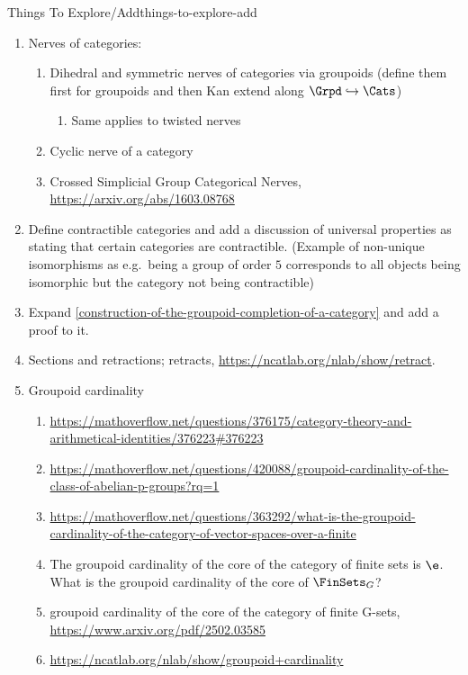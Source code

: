\begin{remark}{Things To Explore/Add}{things-to-explore-add}
\begin{enumerate}
        \item Nerves of categories:
            \begin{enumerate}
                \item Dihedral and symmetric nerves of categories via groupoids (define them first for groupoids and then Kan extend along $\Grpd\hookrightarrow\Cats$)
                    \begin{enumerate}
                        \item Same applies to twisted nerves
                    \end{enumerate}
                \item Cyclic nerve of a category
                \item Crossed Simplicial Group Categorical Nerves, \url{https://arxiv.org/abs/1603.08768}
            \end{enumerate}
        \item Define contractible categories and add a discussion of universal properties as stating that certain categories are contractible. (Example of non-unique isomorphisms as e.g.\ being a group of order $5$ corresponds to all objects being isomorphic but the category not being contractible)
        \item Expand \cref{construction-of-the-groupoid-completion-of-a-category} and add a proof to it.
        \item Sections and retractions; retracts, \url{https://ncatlab.org/nlab/show/retract}.
        \item Groupoid cardinality
            \begin{enumerate}
                \item \url{https://mathoverflow.net/questions/376175/category-theory-and-arithmetical-identities/376223#376223}
                \item \url{https://mathoverflow.net/questions/420088/groupoid-cardinality-of-the-class-of-abelian-p-groups?rq=1}
                \item \url{https://mathoverflow.net/questions/363292/what-is-the-groupoid-cardinality-of-the-category-of-vector-spaces-over-a-finite}
                \item The groupoid cardinality of the core of the category of finite sets is $\e$. What is the groupoid cardinality of the core of $\FinSets_{G}$?
                \item groupoid cardinality of the core of the category of finite G-sets, \url{https://www.arxiv.org/pdf/2502.03585}
                \item \url{https://ncatlab.org/nlab/show/groupoid+cardinality}

\end{enumerate}
\end{enumerate}
\end{remark}

